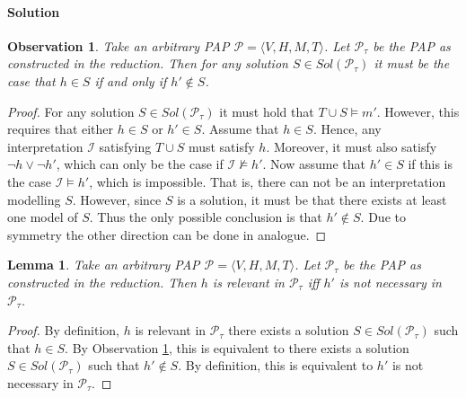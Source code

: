 \documentclass [11pt]{article}
\newcommand{\nmodels}{\not\models}
\newtheorem{lemma}[theorem]{Lemma}
\newtheorem{observation}[theorem]{Observation}
\begin{document}
\paragraph*{Solution}


\begin{observation}
\label{obs:2-h-distinct}
Take an arbitrary PAP  $\mathcal{P}=\langle V,H,M,T \rangle$. Let $\mathcal{P}_{\tau}$ be the PAP as constructed in the reduction. Then for any solution $S \in Sol(\mathcal{P}_{\tau})$ it must be the case that $h \in S$ if and only if $h' \notin S$.
\end{observation}
\begin{proof}
For any solution $S \in Sol(\mathcal{P}_{\tau})$ it must hold that $T \cup S \models m'$. However, this requires that either $h \in S$ or $h' \in S$. Assume that $h \in S$. Hence, any interpretation $\mathcal{I}$ satisfying $T \cup S$ must satisfy $h$. Moreover, it must also satisfy $\neg h \lor \neg h'$, which can only be the case if $\mathcal{I} \nmodels h'$. Now assume that $h' \in S$ if this is the case $\mathcal{I} \models h'$, which is impossible. That is, there can not be an interpretation modelling $S$. However, since $S$ is a solution, it must be that there exists at least one model of $S$. Thus the only possible conclusion is that  $h' \notin S$. Due to symmetry the other direction can be done in analogue.
\end{proof}


\begin{lemma}
\label{lemma:2-equiv2}
Take an arbitrary PAP  $\mathcal{P}=\langle V,H,M,T \rangle$. Let $\mathcal{P}_{\tau}$ be the PAP as constructed in the reduction.  Then $h$ is relevant in $\mathcal{P}_{\tau}$ iff 
$h'$ is not necessary in $\mathcal{P}_{\tau}$.
\end{lemma}
\begin{proof}
By definition, $h$ is relevant in $\mathcal{P}_{\tau}$ there exists a solution $S \in Sol(\mathcal{P}_{\tau})$ such that $h\in S$. By Observation \ref{obs:2-h-distinct}, this is equivalent to there exists a solution $S \in Sol(\mathcal{P}_{\tau})$ such that $h'\notin S$. By definition, this is equivalent to $h'$ is not necessary in $\mathcal{P}_{\tau}$.
\end{proof}
\end{document}
